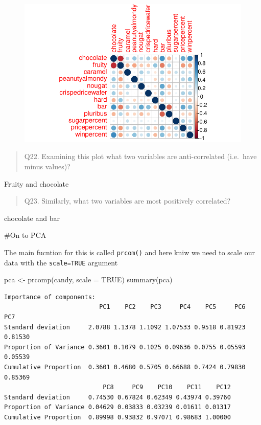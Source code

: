 \documentclass[
  letterpaper,
  DIV=11,
  numbers=noendperiod]{scrartcl}
\newenvironment{Shaded}{\begin{snugshade}}{\end{snugshade}}
\newcommand{\AttributeTok}[1]{\textcolor[rgb]{0.40,0.45,0.13}{#1}}
\newcommand{\ConstantTok}[1]{\textcolor[rgb]{0.56,0.35,0.01}{#1}}
\newcommand{\FunctionTok}[1]{\textcolor[rgb]{0.28,0.35,0.67}{#1}}
\newcommand{\NormalTok}[1]{\textcolor[rgb]{0.00,0.23,0.31}{#1}}
\newcommand{\OtherTok}[1]{\textcolor[rgb]{0.00,0.23,0.31}{#1}}
\begin{document}
\begin{figure}[H]

{\centering \includegraphics{class09_files/figure-pdf/unnamed-chunk-26-1.pdf}

}

\end{figure}

\begin{quote}
Q22. Examining this plot what two variables are anti-correlated
(i.e.~have minus values)?
\end{quote}

Fruity and chocolate

\begin{quote}
Q23. Similarly, what two variables are most positively correlated?
\end{quote}

chocolate and bar

\#On to PCA

The main fucntion for this is called \texttt{prcom()} and here kniw we
need to scale our data with the \texttt{scale=TRUE} argument

\begin{Shaded}
\begin{Highlighting}[]
\NormalTok{pca }\OtherTok{\textless{}{-}} \FunctionTok{prcomp}\NormalTok{(candy, }\AttributeTok{scale =} \ConstantTok{TRUE}\NormalTok{)}
\FunctionTok{summary}\NormalTok{(pca)}
\end{Highlighting}
\end{Shaded}

\begin{verbatim}
Importance of components:
                          PC1    PC2    PC3     PC4    PC5     PC6     PC7
Standard deviation     2.0788 1.1378 1.1092 1.07533 0.9518 0.81923 0.81530
Proportion of Variance 0.3601 0.1079 0.1025 0.09636 0.0755 0.05593 0.05539
Cumulative Proportion  0.3601 0.4680 0.5705 0.66688 0.7424 0.79830 0.85369
                           PC8     PC9    PC10    PC11    PC12
Standard deviation     0.74530 0.67824 0.62349 0.43974 0.39760
Proportion of Variance 0.04629 0.03833 0.03239 0.01611 0.01317
Cumulative Proportion  0.89998 0.93832 0.97071 0.98683 1.00000
\end{verbatim}
\end{document}
